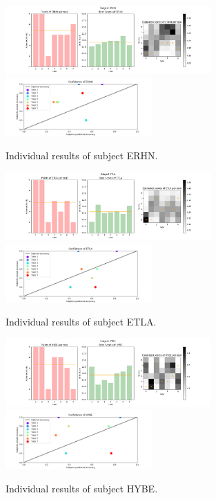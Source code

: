 \documentclass[../main/main.tex]{subfiles}
\begin{document}
	\begin{figure}[H]
		\centering
		\captionsetup{justification=centering}
		\includegraphics[width=0.7\textwidth]{../assets/ERHN_results.png}
		\includegraphics[width=0.5\textwidth]{../assets/ERHN_confidence.png}
		\caption{Individual results of subject ERHN.} 
		\label{fig:ERHN}
	\end{figure}
	\begin{figure}[H]
		\centering
		\captionsetup{justification=centering}
		\includegraphics[width=0.7\textwidth]{../assets/ETLA_results.png}
		\includegraphics[width=0.5\textwidth]{../assets/ETLA_confidence.png}
		\caption{Individual results of subject ETLA.} 
		\label{fig:ETLA}
	\end{figure}
	\begin{figure}[H]
		\centering
		\captionsetup{justification=centering}
		\includegraphics[width=0.7\textwidth]{../assets/HYBE_results.png}
		\includegraphics[width=0.5\textwidth]{../assets/HYBE_confidence.png}
		\caption{Individual results of subject HYBE.} 
		\label{fig:HYBE}
	\end{figure}
\end{document}
